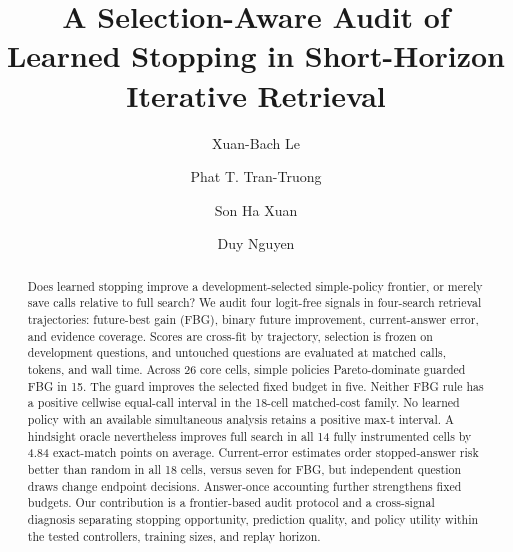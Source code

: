 \documentclass[sigconf,balance=false]{acmart}
\begin{document}
\title{A Selection-Aware Audit of Learned Stopping in Short-Horizon Iterative Retrieval}

\author{Xuan-Bach Le}
\author{Phat T. Tran-Truong}
\authornotemark[1]
\author{Son Ha Xuan}

\author{Duy Nguyen}
\renewcommand{\shortauthors}{Le et al.}


\begin{abstract}
Does learned stopping improve a development-selected simple-policy frontier,
or merely save calls relative to full search? We audit four logit-free signals
in four-search retrieval trajectories: future-best gain (FBG), binary future
improvement, current-answer error, and evidence coverage. Scores are cross-fit
by trajectory, selection is frozen on development questions, and untouched
questions are evaluated at matched calls, tokens, and wall time.
Across 26 core cells, simple policies Pareto-dominate guarded FBG in 15.
The guard improves the selected fixed budget in five. Neither FBG rule has a
positive cellwise equal-call interval in the 18-cell matched-cost family.
No learned policy with an available simultaneous analysis retains a positive
max-t interval. A hindsight oracle nevertheless improves full search in all
14 fully instrumented cells by 4.84 exact-match points on average.
Current-error estimates order stopped-answer risk better than random in all
18 cells, versus seven for FBG, but independent question draws change endpoint
decisions. Answer-once accounting further strengthens fixed budgets.
Our contribution is a frontier-based audit protocol and a cross-signal
diagnosis separating stopping opportunity, prediction quality, and policy
utility within the tested controllers, training sizes, and replay horizon.
\end{abstract}
\end{document}

